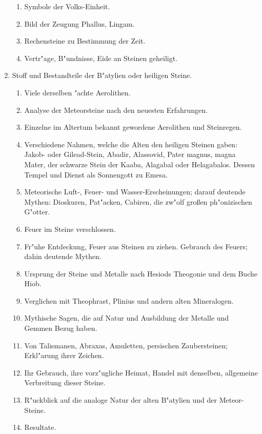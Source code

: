 \documentclass[a4paper, 11pt, oneside, polutonikogreek, german]{article}
\begin{document}
\begin{enumerate}
\begin{enumerate}
        \item Symbole der Volks-Einheit.
        \item Bild der Zeugung Phallus, Lingam.
        \item Rechensteine zu Bestimmung der Zeit.
        \item Vertr"age, B"undnisse, Eide an Steinen geheiligt.
    \end{enumerate}
    \item Stoff und Bestandteile der B"atylien oder heiligen Steine.
    \begin{enumerate}
        \item Viele derselben "achte Aerolithen.
        \item Analyse der Meteorsteine nach den neuesten Erfahrungen.
        \item Einzelne im Altertum bekannt gewordene Aerolithen und Steinregen.
        \item Verschiedene Nahmen, welche die Alten den heiligen Steinen gaben: Jakob- oder Gilead-Stein, Abadir, Alassovid, Pater magnus, magna Mater, der schwarze Stein der Kaaba, Alagabal oder Helagabalos. Dessen Tempel und Dienst als Sonnengott zu Emesa.
        \item Meteorische Luft-, Feuer- und Wasser-Erscheinungen; darauf deutende Mythen: Dioskuren, Pat"acken, Cabiren, die zw"olf großen ph"onizischen G"otter.
        \item Feuer im Steine verschlossen.
        \item Fr"uhe Entdeckung, Feuer aus Steinen zu ziehen. Gebrauch des Feuers; dahin deutende Mythen.
        \item Ursprung der Steine und Metalle nach Hesiods Theogonie und dem Buche Hiob.
        \item Verglichen mit Theophrast, Plinius und andern alten Mineralogen.
        \item Mythische Sagen, die auf Natur und Ausbildung der Metalle und Gemmen Bezug haben.
        \item Von Talismanen, Abraxas, Amuletten, persischen Zaubersteinen; Erkl"arung ihrer Zeichen.
        \item Ihr Gebrauch, ihre vorz"ugliche Heimat, Handel mit denselben, allgemeine Verbreitung dieser Steine.
        \item R"uckblick auf die analoge Natur der alten B"atylien und der Meteor-Steine.
        \item Resultate.
    \end{enumerate}
\end{enumerate}
\clearpage
\end{document}
